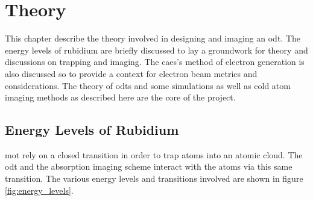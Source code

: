 \chapter{Theory}

This chapter describe the theory involved in designing and imaging an \gls{odt}. The energy levels of rubidium are briefly discussed to lay a groundwork for theory and discussions on trapping and imaging. The \gls{caes}'s method of electron generation is also discussed so to provide a context for electron beam metrics and considerations. The theory of \glspl{odt} and some simulations as well as cold atom imaging methods as described here are the core of the project.

\section{Energy Levels of Rubidium}

\Gls{mot} rely on a closed transition in order to trap atoms into an atomic cloud. The \Gls{odt} and the absorption imaging scheme interact with the atoms via this same transition. The various energy levels and transitions involved are shown in figure \ref{fig:energy_levels}.

